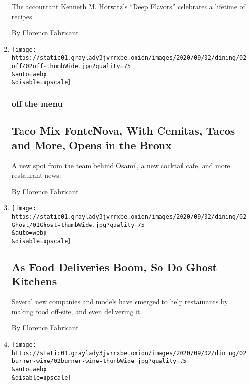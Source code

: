 \begin{enumerate}
  The accountant Kenneth M. Horwitz's ``Deep Flavors'' celebrates a
  lifetime of recipes.

  By Florence Fabricant
\item
  \href{/2020/09/01/dining/nyc-restaurant-news.html}{}

  \texttt{[image: https://static01.graylady3jvrrxbe.onion/images/2020/09/02/dining/02off/02off-thumbWide.jpg?quality=75\\\&auto=webp\\\&disable=upscale]}

  \hypertarget{off-the-menu}{%
  \subsubsection{off the menu}\label{off-the-menu}}

  \hypertarget{taco-mix-fontenova-with-cemitas-tacos-and-more-opens-in-the-bronx}{%
  \subsection{Taco Mix FonteNova, With Cemitas, Tacos and More, Opens in
  the
  Bronx}\label{taco-mix-fontenova-with-cemitas-tacos-and-more-opens-in-the-bronx}}

  A new spot from the team behind Osamil, a new cocktail cafe, and more
  restaurant news.

  By Florence Fabricant
\item
  \href{/2020/09/01/dining/ghost-kitchens-delivery-pandemic.html}{}

  \texttt{[image: https://static01.graylady3jvrrxbe.onion/images/2020/09/02/dining/02Ghost/02Ghost-thumbWide.jpg?quality=75\\\&auto=webp\\\&disable=upscale]}

  \hypertarget{as-food-deliveries-boom-so-do-ghost-kitchens}{%
  \subsection{As Food Deliveries Boom, So Do Ghost
  Kitchens}\label{as-food-deliveries-boom-so-do-ghost-kitchens}}

  Several new companies and models have emerged to help restaurants by
  making food off-site, and even delivering it.

  By Florence Fabricant
\item
  \href{/2020/08/31/dining/hounds-tree-wine.html}{}

  \texttt{[image: https://static01.graylady3jvrrxbe.onion/images/2020/09/02/dining/02burner-wine/02burner-wine-thumbWide.jpg?quality=75\\\&auto=webp\\\&disable=upscale]}


\end{enumerate}
